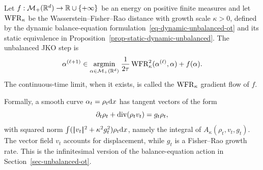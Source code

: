 \begin{defn}\label{def-wfr-jko-gradient-flow}
	Let $f:\mathcal{M}_+(\mathbb{R}^d)\to\mathbb{R}\cup\{+\infty\}$ be an energy on positive finite measures and let $\operatorname{WFR}_\kappa$ be the Wasserstein--Fisher--Rao distance with growth scale $\kappa>0$, defined by the dynamic balance-equation formulation~\eqref{eq-dynamic-unbalanced-ot} and its static equivalence in Proposition~\ref{prop-static-dynamic-unbalanced}. The unbalanced JKO step is
	\begin{equation}\label{eq-wfr-jko}
		\alpha^{(\ell+1)}
		\in
		\underset{\alpha\in\mathcal{M}_+(\mathbb{R}^d)}{\operatorname{argmin}}\;
		\frac{1}{2\tau}\operatorname{WFR}_\kappa^2(\alpha^{(\ell)},\alpha)+f(\alpha).
	\end{equation}
	The continuous-time limit, when it exists, is called the $\operatorname{WFR}_\kappa$ gradient flow of $f$.
\end{defn}

Formally, a smooth curve $\alpha_t=\rho_t\mathrm{d} x$ has tangent vectors of the form
\[
	\partial_t\rho_t+\operatorname{div}(\rho_t v_t)=g_t\rho_t,
\]
with squared norm $\int(|\!| v_t |\!|^2+\kappa^2 g_t^2)\rho_t\mathrm{d} x$, namely the integral of \(A_\kappa(\rho_t,v_t,g_t)\). The vector field \(v_t\) accounts for displacement, while \(g_t\) is a Fisher--Rao growth rate. This is the infinitesimal version of the balance-equation action in Section~\ref{sec-unbalanced-ot}.

